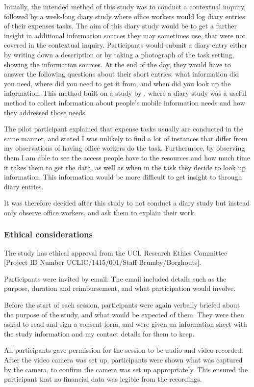 Initially, the intended method of this study was to conduct a contextual inquiry, followed by a week-long diary study where office workers would log diary entries of their expenses tasks. The aim of this diary study would be to get a further insight in additional information sources they may sometimes use, that were not covered in the contextual inquiry.  Participants would submit a diary entry either by writing down a description or by taking a photograph of the task setting, showing the information sources. At the end of the day, they would have to answer the following questions about their short entries: what information did you need, where did you need to get it from, and when did you look up the information. This method built on a study by \citet{Sohn2008}, where a diary study was a useful method to collect information about people's mobile information needs and how they addressed those needs. 

The pilot participant explained that expense tasks usually are conducted in the same manner, and stated I was unlikely to find a lot of instances that differ from my observations of having office workers do the task.
Furthermore, by observing them I am able to see the access people have to the resources and how much time it takes them to get the data, as well as when in the task they decide to look up information. This information would be more difficult to get insight to through diary entries.

It was therefore decided after this study to not conduct a diary study but instead only observe office workers, and ask them to explain their work.

\subsubsection{Ethical considerations}
The study has ethical approval from the UCL Research Ethics Committee [Project ID Number UCLIC/1415/001/Staff Brumby/Borghouts]. 

Participants were invited by email. The email included details such as the purpose, duration and reimbursement, and what participation would involve. 

Before the start of each session, participants were again verbally briefed about the purpose of the study, and what would be expected of them. They were then asked to read and sign a consent form, and were given an information sheet with the study information and my contact details for them to keep. 

All participants gave permission for the session to be audio and video recorded. After the video camera was set up, participants were shown what was captured by the camera, to confirm the camera was set up appropriately. This ensured the participant that no financial data was legible from the recordings.

